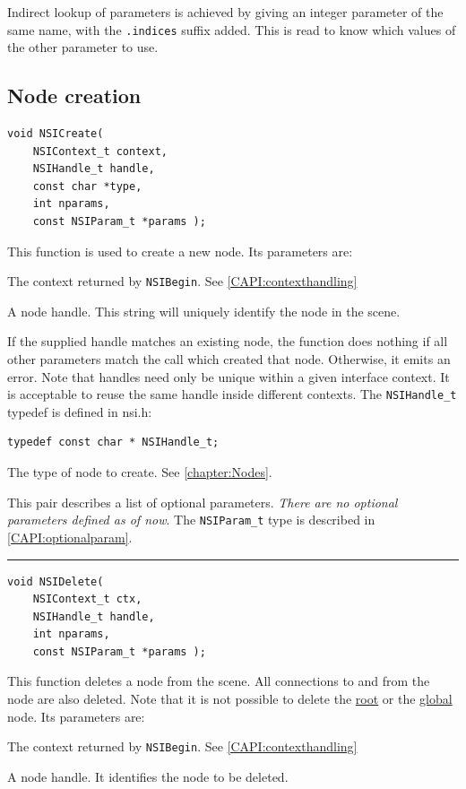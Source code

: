 \documentclass[oneside,ebook]{memoir}
\newcommand*{\smallrule}{\begin{center}\rule{3cm}{.1pt}\end{center}}
\newcommand{\paramlistitemN}[1]{\item[#1]}
\begin{document}
\label{parameter:indirect}
Indirect lookup of parameters is achieved by giving an integer parameter of the same name, with the \lstinline|.indices| suffix added.
This is read to know which values of the other parameter to use.
\goodbreak
\subsection{Node creation}
\label{CAPI:nsicreate}
\begin{lstlisting}[style=CAPI]
void NSICreate(
	NSIContext_t context,
	NSIHandle_t handle,
	const char *type,
	int nparams,
	const NSIParam_t *params );
\end{lstlisting}
This function is used to create a new node. Its parameters are:
\begin{paramlist}
\paramlistitemN{context}
The context returned by \lstinline|NSIBegin|. See \autoref{CAPI:contexthandling}
\paramlistitemN{handle}
A node handle. This string will uniquely identify the node in the scene.

If the supplied handle matches an existing node, the function does nothing if all other parameters match the call which created that node. Otherwise, it emits an error. Note that handles need only be unique within a given interface context. It is acceptable to reuse the same handle inside different contexts. The \lstinline|NSIHandle_t| typedef is defined in nsi.h:
\begin{lstlisting}[style=CAPI]
typedef const char * NSIHandle_t;
\end{lstlisting}

\paramlistitemN{type}
The type of node to create. See \autoref{chapter:Nodes}.
\paramlistitemN{nparams, params}
This pair describes a list of optional parameters. \emph{There are no optional parameters defined as of now}. The \lstinline|NSIParam_t| type is described in \autoref{CAPI:optionalparam}.
\end{paramlist}
\smallrule
\begin{lstlisting}[style=CAPI]
void NSIDelete(
	NSIContext_t ctx,
	NSIHandle_t handle,
	int nparams,
	const NSIParam_t *params );
\end{lstlisting}
This function deletes a node from the scene.
All connections to and from the node are also deleted.
Note that it is not possible to delete the \hyperref[section:rootnode]{root} or the \hyperref[section:globalnode]{global} node.
Its parameters are:
\begin{paramlist}
\paramlistitemN{context}
The context returned by \lstinline|NSIBegin|. See \autoref{CAPI:contexthandling}
\paramlistitemN{handle}
A node handle. It identifies the node to be deleted.
\end{paramlist}
\end{document}
